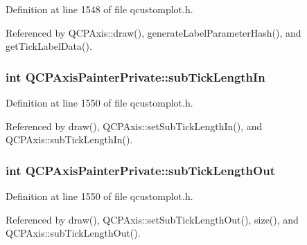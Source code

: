 Definition at line 1548 of file qcustomplot.\+h.



Referenced by Q\+C\+P\+Axis\+::draw(), generate\+Label\+Parameter\+Hash(), and get\+Tick\+Label\+Data().

\hypertarget{class_q_c_p_axis_painter_private_af11f7d83021c9cb3b0e76fe7814c6110}{}
\subsubsection[{sub\+Tick\+Length\+In}]{\setlength{\rightskip}{0pt plus 5cm}int Q\+C\+P\+Axis\+Painter\+Private\+::sub\+Tick\+Length\+In}\label{class_q_c_p_axis_painter_private_af11f7d83021c9cb3b0e76fe7814c6110}


Definition at line 1550 of file qcustomplot.\+h.



Referenced by draw(), Q\+C\+P\+Axis\+::set\+Sub\+Tick\+Length\+In(), and Q\+C\+P\+Axis\+::sub\+Tick\+Length\+In().

\hypertarget{class_q_c_p_axis_painter_private_a5f1afddc3dc7ccc4d5adcbcd8f0c2218}{}
\subsubsection[{sub\+Tick\+Length\+Out}]{\setlength{\rightskip}{0pt plus 5cm}int Q\+C\+P\+Axis\+Painter\+Private\+::sub\+Tick\+Length\+Out}\label{class_q_c_p_axis_painter_private_a5f1afddc3dc7ccc4d5adcbcd8f0c2218}


Definition at line 1550 of file qcustomplot.\+h.



Referenced by draw(), Q\+C\+P\+Axis\+::set\+Sub\+Tick\+Length\+Out(), size(), and Q\+C\+P\+Axis\+::sub\+Tick\+Length\+Out().

\hypertarget{class_q_c_p_axis_painter_private_a9b9cf594cd16575f52ecda9abef4e412}{}
